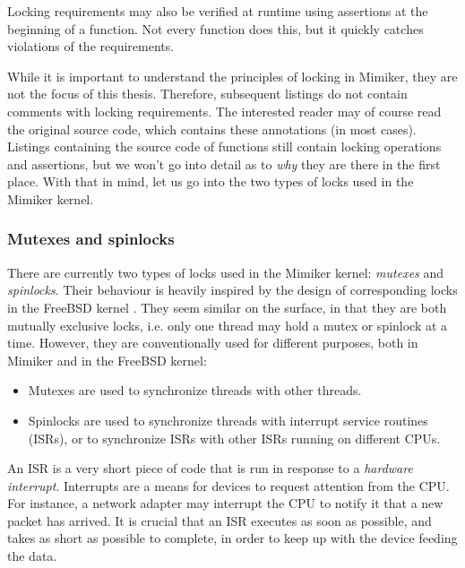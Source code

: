 \documentclass[shortabstract, manyadvisors, english, mgr]{iithesis}
\begin{document}
Locking requirements may also be verified at runtime using assertions at the
beginning of a function. Not every function does this, but it quickly catches
violations of the requirements. 

While it is important to understand the principles of locking in Mimiker, they
are not the focus of this thesis. Therefore, subsequent listings do not contain
comments with locking requirements. The interested reader may of course read the
original source code, which contains these annotations (in most cases). Listings
containing the source code of functions still contain locking operations and
assertions, but we won't go into detail as to \textit{why} they are there in the
first place. With that in mind, let us go into the two types of locks used in
the Mimiker kernel.

\subsubsection*{Mutexes and spinlocks}

There are currently two types of locks used in the Mimiker kernel:
\textit{mutexes} and \textit{spinlocks}. Their behaviour is heavily inspired by
the design of corresponding locks in the FreeBSD kernel \cite{freebsd-locking}
\cite[Section~4.3, Subsection ``Mutex Synchronization'']{freebsd-book}.
They seem similar on the surface, in that they are both mutually exclusive
locks, i.e. only one thread may hold a mutex or spinlock at a time. However,
they are conventionally used for different purposes, both in Mimiker and in the
FreeBSD kernel:
\begin{itemize}
\item Mutexes are used to synchronize threads with other threads.
\item Spinlocks are used to synchronize threads with interrupt service routines
  (ISRs), or to synchronize ISRs with other ISRs running on different CPUs.
\end{itemize}
An ISR is a very short piece of code that is run in response to a
\textit{hardware interrupt}. Interrupts are a means for devices to request
attention from the CPU. For instance, a network adapter may interrupt the CPU to
notify it that a new packet has arrived. It is crucial that an ISR executes as
soon as possible, and takes as short as possible to complete, in order to keep
up with the device feeding the data.
\end{document}
